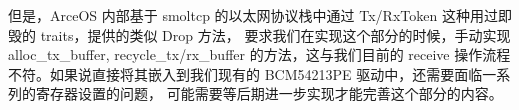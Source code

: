 \begin{itemize}
        但是，ArceOS 内部基于 smoltcp 的以太网协议栈中通过 Tx/RxToken 这种用过即毁的 traits，提供的类似 Drop 方法，
        要求我们在实现这个部分的时候，手动实现 alloc\_tx\_buffer, recycle\_tx/rx\_buffer 的方法，这与我们目前的
        receive 操作流程不符。如果说直接将其嵌入到我们现有的 BCM54213PE 驱动中，还需要面临一系列的寄存器设置的问题，
        可能需要等后期进一步实现才能完善这个部分的内容。

    \end{itemize}